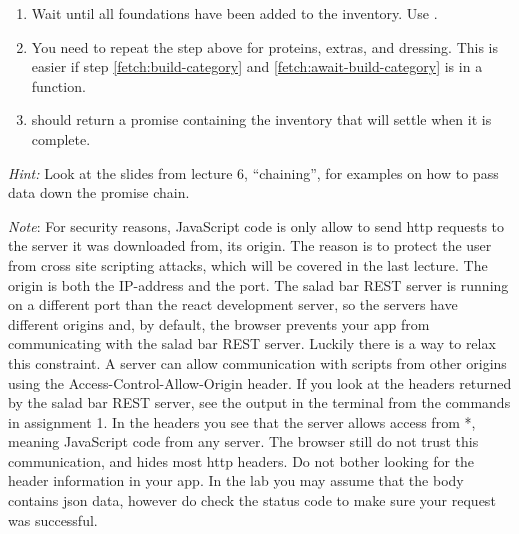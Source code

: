 \documentclass[fleqn, article, a4paper]{memoir}
\begin{document}
\begin{Assignments}
\begin{enumerate}
\item \label{fetch:await-build-category} Wait until all foundations have been added to the inventory. Use .
\item You need to repeat the step above for proteins, extras, and dressing. This is easier if step \ref{fetch:build-category} and \ref{fetch:await-build-category} is in a function.
\item {} should return a promise containing the inventory that will settle when it is complete.
\end{enumerate}
\emph{Hint:} Look at the slides from lecture 6, ``chaining'', for examples on how to pass data down the promise chain.

\emph{Note}: For security reasons, JavaScript code is only allow to send http requests to the server it was downloaded from, its origin. The reason is to protect the user from cross site scripting attacks, which will be covered in the last lecture. The origin is both the IP-address and the port. The salad bar REST server is running on a different port than the react development server, so the servers have different origins and, by default, the browser prevents your app from communicating with the salad bar REST server. Luckily there is a way to relax this constraint. A server can allow communication with scripts from other origins using the Access-Control-Allow-Origin header. If you look at the headers returned by the salad bar REST server, see the output in the terminal from the  commands in assignment 1. In the headers you see that the server allows access from *, meaning JavaScript code from any server. The browser still do not trust this communication, and hides most http headers. Do not bother looking for the header information in your app. In the lab you may assume that the body contains json data, however do check the status code to make sure your request was successful.


\end{Assignments}
\end{document}

